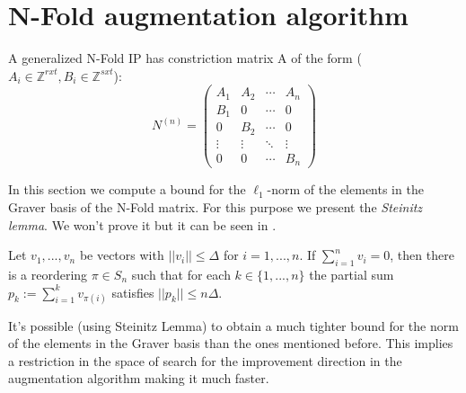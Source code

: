 \section{N-Fold augmentation algorithm}


A generalized N-Fold IP has constriction matrix A of the form ($A_i \in \mathbb{Z}^{rxt}, B_i \in \mathbb{Z}^{sxt}$):\\
\begin{equation*}
N^{(n)} = 
\begin{pmatrix}
A_1 & A_2 & \cdots & A_n \\
B_1 & 0   & \cdots & 0 \\
0   & B_2 & \cdots & 0 \\
\vdots    & \vdots & \ddots & \vdots  \\
0   & 0   & \cdots & B_n 
\end{pmatrix}
\end{equation*}

In this section we compute a bound for the $\ell_1$-norm of the elements in the Graver basis of the N-Fold matrix. For this purpose we present the \textit{Steinitz lemma}. We won't prove it but it can be seen in \cite{STEINITZ:1913}.

\begin{lemma}
    Let $v_1,...,v_n$ be vectors with $||v_i|| \leq \Delta$ for $i = 1,...,n$. If $\sum_{i=1}^{n} v_i = 0$, then there is a reordering $\pi \in S_n$ such that for each $k \in \{1,...,n\}$ the partial sum $p_k := \sum_{i=1}^{k}v_{\pi(i)}$ satisfies $||p_k|| \leq n\Delta$.
\end{lemma}

It's possible (using Steinitz Lemma) to obtain a much tighter bound for the norm of the elements in the Graver basis than the ones mentioned before. This implies a restriction in the space of search for the improvement direction in the augmentation algorithm making it much faster.

